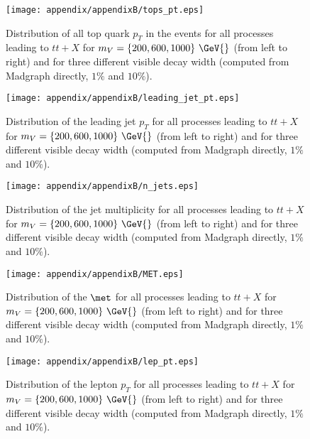 \begin{figure}[!h!tpd]
  \centering
  \texttt{[image: appendix/appendixB/tops\_pt.eps]}
  \caption{
    Distribution of all top quark $p_T$ in the events for all processes leading to $tt+X$
    for $m_V = \{200, 600, 1000\}~\GeV{}$ (from left to right) and for three different
    visible decay width (computed from Madgraph directly, $1\%$ and $10\%$).
  }   
  \label{fig:appB:pTAllTops}
\end{figure}


\begin{figure}[!h!tpd]
  \centering
  \texttt{[image: appendix/appendixB/leading\_jet\_pt.eps]}
  \caption{
      Distribution of the leading jet $p_T$ for all processes leading to $tt+X$
      for $m_V = \{200, 600, 1000\}~\GeV{}$ (from left to right) and for three different
      visible decay width (computed from Madgraph directly, $1\%$ and $10\%$).
  }   
  \label{fig:appB:Vmass}
\end{figure}


\begin{figure}[!h!tpd]
  \centering
  \texttt{[image: appendix/appendixB/n\_jets.eps]}
  \caption{
      Distribution of the jet multiplicity for all processes leading to $tt+X$
      for $m_V = \{200, 600, 1000\}~\GeV{}$ (from left to right) and for three different
      visible decay width (computed from Madgraph directly, $1\%$ and $10\%$).
  }   
  \label{fig:appB:Vmass}
\end{figure}


\begin{figure}[!h!tpd]
  \centering
  \texttt{[image: appendix/appendixB/MET.eps]}
  \caption{
      Distribution of the $\met$ for all processes leading to $tt+X$
      for $m_V = \{200, 600, 1000\}~\GeV{}$ (from left to right) and for three different
      visible decay width (computed from Madgraph directly, $1\%$ and $10\%$).
  }   
  \label{fig:appB:Vmass}
\end{figure}



\begin{figure}[!h!tpd]
  \centering
  \texttt{[image: appendix/appendixB/lep\_pt.eps]}
  \caption{
      Distribution of the lepton $p_T$ for all processes leading to $tt+X$
      for $m_V = \{200, 600, 1000\}~\GeV{}$ (from left to right) and for three different
      visible decay width (computed from Madgraph directly, $1\%$ and $10\%$).
  }   
  \label{fig:appB:Vmass}
\end{figure}


